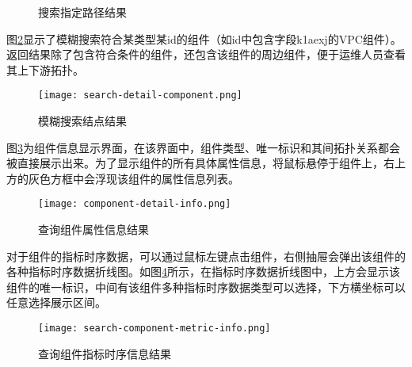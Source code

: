 \begin{figure}[H]
    \caption{搜索指定路径结果\label{search-component-path}}
\end{figure}
\newpage
图\ref{search-detail-component}显示了模糊搜索符合某类型某id的组件（如id中包含字段k1aexj的VPC组件）。返回结果除了包含符合条件的组件，还包含该组件的周边组件，便于运维人员查看其上下游拓扑。
\begin{figure}[htbp]
    \centering
    \texttt{[image: search-detail-component.png]}
    \caption{模糊搜索结点结果\label{search-detail-component}}
\end{figure}

图\ref{component-detail-info}为组件信息显示界面，在该界面中，组件类型、唯一标识和其间拓扑关系都会被直接展示出来。为了显示组件的所有具体属性信息，将鼠标悬停于组件上，右上方的灰色方框中会浮现该组件的属性信息列表。
\begin{figure}[htbp]
    \centering
    \texttt{[image: component-detail-info.png]}
    \caption{查询组件属性信息结果\label{component-detail-info}}
\end{figure}

对于组件的指标时序数据，可以通过鼠标左键点击组件，右侧抽屉会弹出该组件的各种指标时序数据折线图。如图\ref{search-component-metric-info}所示，在指标时序数据折线图中，上方会显示该组件的唯一标识，中间有该组件多种指标时序数据类型可以选择，下方横坐标可以任意选择展示区间。
\begin{figure}[htbp]
    \centering
    \texttt{[image: search-component-metric-info.png]}
    \caption{查询组件指标时序信息结果\label{search-component-metric-info}}
\end{figure}

